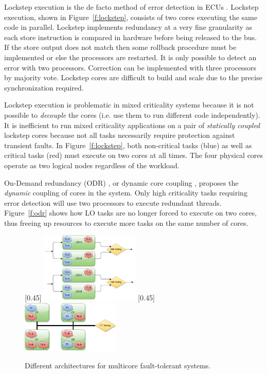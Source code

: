 \documentclass[conference]{IEEEtran}
\begin{document}
	Lockstep execution \cite{baleani2003} is the de facto method of error detection in ECUs \cite{infineon2014aurix,freescale2014qorivva,renesas2016lockstep}. Lockstep execution, shown in Figure~\ref{f:lockstep}, consists of two cores executing the same code in parallel. 
	Lockstep implements redundancy at a very fine granularity as each store instruction is compared in hardware before being released to the bus. 
	If the store output does not match then some rollback procedure must be implemented or else the processors are restarted. 
	It is only possible to detect an error with two processors. 
	Correction can be implemented with three processors by majority vote. 
	Lockstep cores are difficult to build and scale due to the precise synchronization required.

	Lockstep execution is problematic in mixed criticality systems because it is not possible to \emph{decouple} the cores (i.e. use them to run different code independently). 
	It is inefficient to run mixed criticality applications on a pair of \emph{statically coupled} lockstep cores because not all tasks necessarily require protection against transient faults. 
	In Figure~\ref{f:lockstep}, both non-critical tasks (blue) as well as critical tasks (red) must execute on two cores at all times. 	
	The four physical cores operate as two logical nodes regardless of the workload.

	On-Demand redundancy (ODR) \cite{Meyer:CASES11,fu2013demand}, or dynamic core coupling \cite{lafrieda2007utilizing}, proposes the \emph{dynamic} coupling of cores in the system. 
	Only high criticality tasks requiring error detection will use two processors to execute redundant threads. 
	Figure~\ref{f:odr} shows how LO tasks are no longer forced to execute on two cores, thus freeing up resources to execute more tasks on the same number of cores.


\begin{figure}
\captionsetup[subfigure]{singlelinecheck=false}
\centering
{}[0.45\textwidth]
{
    \includegraphics[width=0.42\textwidth]{lockstep.pdf}
}%
\hfill
{}[0.45\textwidth]
{
    \includegraphics[width=0.42\textwidth]{odr.pdf}
}%
\caption{Different architectures for multicore fault-tolerant systems.}
\label{f:ft-arch}
\end{figure}
\end{document}
